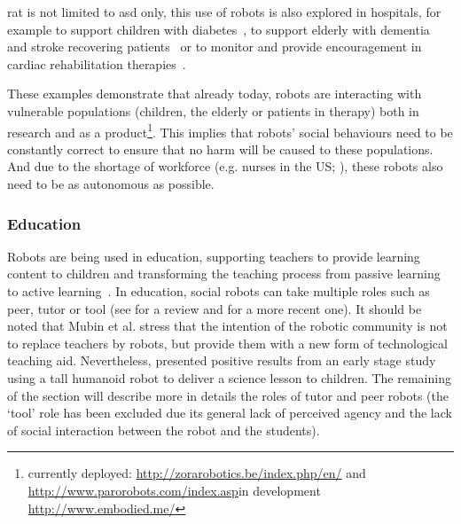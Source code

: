 \gls{rat} is not limited to \gls{asd} only, this use of robots is also explored in hospitals, for example to support children with diabetes~\citep{belpaeme2012multimodal}, to support elderly with dementia~\citep{wada2005psychological} and stroke recovering patients~\citep{mataric2007socially} or to monitor and provide encouragement in cardiac rehabilitation therapies~\citep{lara2017human}.	

These examples demonstrate that already today, robots are interacting with vulnerable populations (children, the elderly or patients in therapy) both in research and as a product\footnote{currently deployed: \url{http://zorarobotics.be/index.php/en/} and \url{http://www.parorobots.com/index.asp}\newline in development \url{http://www.embodied.me/}}. This implies that robots' social behaviours need to be constantly correct to ensure that no harm will be caused to these populations. And due to the shortage of workforce (e.g. nurses in the US; \citealt{nevidjon2001nursing}), these robots also need to be as autonomous as possible.

\subsubsection{Education} 

Robots are being used in education, supporting teachers to provide learning content to children and transforming the teaching process from passive learning to active learning~\citep{linder2001facilitating}. In education, social robots can take multiple roles such as peer, tutor or tool (see \citealt{mubin2013review} for a review and \citealt{belpaeme2018social} for a more recent one). It should be noted that Mubin et al. stress that the intention of the robotic community is not to replace teachers by robots, but provide them with a new form of technological teaching aid. Nevertheless, \cite{verner2016science} presented positive results from an early stage study using a tall humanoid robot to deliver a science lesson to children. The remaining of the section will describe more in details the roles of tutor and peer robots (the `tool' role has been excluded due its general lack of perceived agency and the lack of social interaction between the robot and the students).

